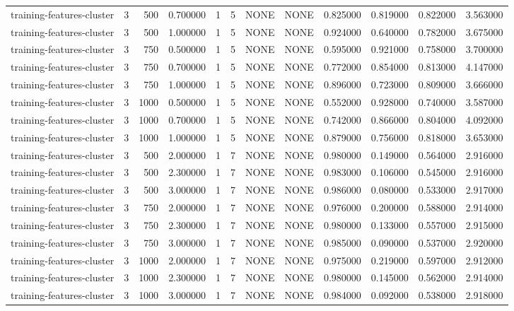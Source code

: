 \begin{tabular}{lrrrllllrrrr}
training-features-cluster & 3 & 500 & 0.700000 & 1 & 5 & NONE & NONE & 0.825000 & 0.819000 & 0.822000 & 3.563000 \\
training-features-cluster & 3 & 500 & 1.000000 & 1 & 5 & NONE & NONE & 0.924000 & 0.640000 & 0.782000 & 3.675000 \\
training-features-cluster & 3 & 750 & 0.500000 & 1 & 5 & NONE & NONE & 0.595000 & 0.921000 & 0.758000 & 3.700000 \\
training-features-cluster & 3 & 750 & 0.700000 & 1 & 5 & NONE & NONE & 0.772000 & 0.854000 & 0.813000 & 4.147000 \\
training-features-cluster & 3 & 750 & 1.000000 & 1 & 5 & NONE & NONE & 0.896000 & 0.723000 & 0.809000 & 3.666000 \\
training-features-cluster & 3 & 1000 & 0.500000 & 1 & 5 & NONE & NONE & 0.552000 & 0.928000 & 0.740000 & 3.587000 \\
training-features-cluster & 3 & 1000 & 0.700000 & 1 & 5 & NONE & NONE & 0.742000 & 0.866000 & 0.804000 & 4.092000 \\
training-features-cluster & 3 & 1000 & 1.000000 & 1 & 5 & NONE & NONE & 0.879000 & 0.756000 & 0.818000 & 3.653000 \\
training-features-cluster & 3 & 500 & 2.000000 & 1 & 7 & NONE & NONE & 0.980000 & 0.149000 & 0.564000 & 2.916000 \\
training-features-cluster & 3 & 500 & 2.300000 & 1 & 7 & NONE & NONE & 0.983000 & 0.106000 & 0.545000 & 2.916000 \\
training-features-cluster & 3 & 500 & 3.000000 & 1 & 7 & NONE & NONE & 0.986000 & 0.080000 & 0.533000 & 2.917000 \\
training-features-cluster & 3 & 750 & 2.000000 & 1 & 7 & NONE & NONE & 0.976000 & 0.200000 & 0.588000 & 2.914000 \\
training-features-cluster & 3 & 750 & 2.300000 & 1 & 7 & NONE & NONE & 0.980000 & 0.133000 & 0.557000 & 2.915000 \\
training-features-cluster & 3 & 750 & 3.000000 & 1 & 7 & NONE & NONE & 0.985000 & 0.090000 & 0.537000 & 2.920000 \\
training-features-cluster & 3 & 1000 & 2.000000 & 1 & 7 & NONE & NONE & 0.975000 & 0.219000 & 0.597000 & 2.912000 \\
training-features-cluster & 3 & 1000 & 2.300000 & 1 & 7 & NONE & NONE & 0.980000 & 0.145000 & 0.562000 & 2.914000 \\
training-features-cluster & 3 & 1000 & 3.000000 & 1 & 7 & NONE & NONE & 0.984000 & 0.092000 & 0.538000 & 2.918000 \\

\end{tabular}
